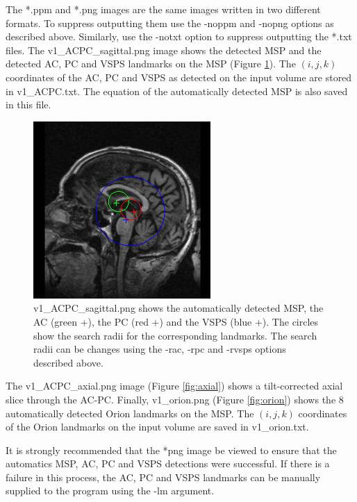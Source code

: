 \documentclass[11pt]{article}
\begin{document}
\noindent The *.ppm and *.png images are the same images 
written in two different formats.  To suppress outputting them use the
-noppm and -nopng options as described above.  Similarly, use the -notxt option to suppress outputting the *.txt 
files.  The v1\_ACPC\_sagittal.png image shows the detected MSP and the detected AC, PC and VSPS landmarks on the
MSP (Figure \ref{fig:sagittal}).  The $(i,j,k)$ coordinates of the AC, PC and VSPS as detected on the input 
volume are stored in v1\_ACPC.txt.  The equation of the automatically detected MSP is also saved in this file.
\begin{figure}
\begin{center}
\includegraphics[scale=1.0]{v1_ACPC_sagittal.png}
\caption{v1\_ACPC\_sagittal.png shows the automatically detected MSP, the AC (green +), the PC (red +) and
the VSPS (blue +).  The circles show the search radii for the corresponding landmarks.  The search radii
can be changes using the -rac, -rpc and -rvsps options described above.
}
\label{fig:sagittal}
\end{center}
\end{figure}

The v1\_ACPC\_axial.png image (Figure \ref{fig:axial}) shows a tilt-corrected axial slice through the AC-PC.
Finally, v1\_orion.png (Figure \ref{fig:orion}) shows the 8 automatically detected Orion landmarks on the
MSP.  The $(i,j,k)$ coordinates of the Orion landmarks on the input volume are saved in v1\_orion.txt.

It is strongly recommended that the *png image be viewed to ensure that the automatics MSP, AC, PC and VSPS 
detections were successful.  If there is a failure in this process, the AC, PC and VSPS landmarks can be
manually supplied to the program  using the -lm argument. 
\vspace{3mm}
\end{document}
